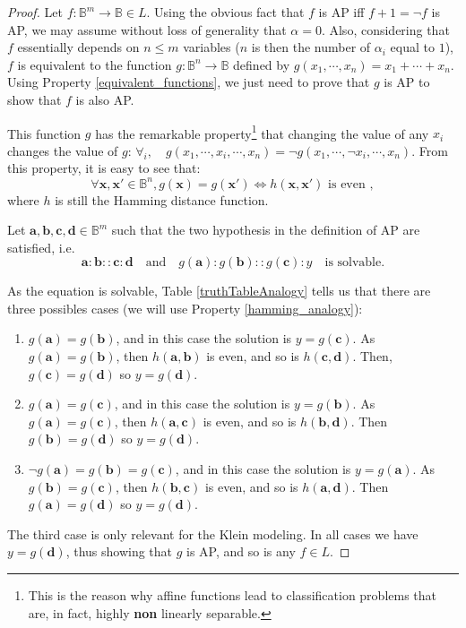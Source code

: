 \begin{proof}
Let $f \colon \mathbb{B}^m \to \mathbb{B} \in L$. Using the obvious fact that
  $f$ is AP  iff $f + 1 = \neg f$ is AP, we may assume without loss of generality that
  $\alpha = 0$. Also, considering that $f$ essentially depends on $n \leq m$
  variables ($n$ is then the number of $\alpha_i$ equal to $1$), $f$ is
  equivalent to the function $g \colon \mathbb{B}^n \to \mathbb{B}$ defined by
  $g(x_1, \cdots, x_n) = x_1 +  \cdots + x_n$. Using Property
  \ref{equivalent_functions}, we just need to prove that $g$ is AP to show that
  $f$ is also AP.

  This function $g$ has the remarkable property\footnote{This is the reason why affine
  functions lead to classification problems that are, in fact, highly
  \textbf{non} linearly separable.} that changing the value of any
  $x_i$ changes the value of $g$: $\forall _i, \quad g(x_1, \cdots, x_i, \cdots, x_n) =
  \neg g(x_1, \cdots, \neg x_i, \cdots, x_n)$. From this property, it is easy to
  see that:
  $$\forall \mathbf{x}, \mathbf{x}' \in \mathbb{B}^n, g(\mathbf{x}) =
  g(\mathbf{x}') \iff h(\mathbf{x}, \mathbf{x}') \text{ is even },$$
  where $h$ is still the Hamming distance function.

  Let $\mathbf{a}, \mathbf{b}, \mathbf{c}, \mathbf{d} \in \mathbb{B}^m$  such
  that the two hypothesis in the definition of AP are satisfied, i.e.
  $$
  \mathbf{a} : \mathbf{b} :: \mathbf{c} : \mathbf{d}\quad \text{and}\quad
  g(\mathbf{a}) : g(\mathbf{b}) :: g(\mathbf{c}) : y\quad  \text{is  solvable}.
  $$

  As the equation is solvable, Table \ref{truthTableAnalogy} tells us that
  there are three possibles cases (we will use Property
  \ref{hamming_analogy}):
  \begin{enumerate}
    \item $g(\mathbf{a}) = g(\mathbf{b})$, and in this case the solution is
      $y = g(\mathbf{c})$. As $g(\mathbf{a}) = g(\mathbf{b})$, then
      $h(\mathbf{a}, \mathbf{b})$ is even, and so is $h(\mathbf{c},
      \mathbf{d})$. Then, $g(\mathbf{c}) = g(\mathbf{d})$ so $y = g(\mathbf{d})$.
    \item $g(\mathbf{a}) = g(\mathbf{c})$, and in this case the solution is $y =
      g(\mathbf{b})$. As $g(\mathbf{a}) = g(\mathbf{c})$, then
      $h(\mathbf{a}, \mathbf{c})$ is even, and so is $h(\mathbf{b},
      \mathbf{d})$. Then $g(\mathbf{b}) = g(\mathbf{d})$ so $y =
      g(\mathbf{d})$.
    \item $\neg g(\mathbf{a}) = g(\mathbf{b}) = g(\mathbf{c})$, and in this
      case the solution is $y = g(\mathbf{a})$. As $g(\mathbf{b}) =
      g(\mathbf{c})$, then $h(\mathbf{b}, \mathbf{c})$ is even, and so is
      $h(\mathbf{a}, \mathbf{d})$. Then $g(\mathbf{a}) = g(\mathbf{d})$ so $y =
      g(\mathbf{d})$.
  \end{enumerate}

  The third case is only relevant for the Klein modeling. In all cases we have
  $y = g(\mathbf{d})$, thus showing that $g$ is AP, and so is any $f \in L$.
\end{proof}


